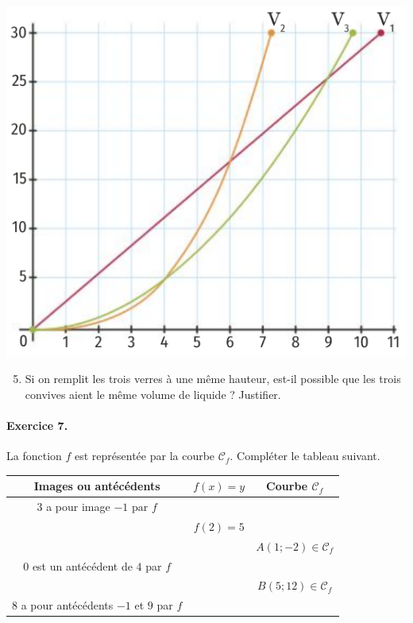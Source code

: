 \documentclass[11pt]{article}
\begin{document}
\begin{minipage}{.35\textwidth}
\includegraphics[scale=.3]{graph-verres.png}
\end{minipage}
\begin{enumerate}
    \setcounter{enumi}{4}
  \item Si on remplit les trois verres à une même hauteur, est-il possible que
    les trois convives aient le même volume de liquide ? Justifier.
\end{enumerate}

\paragraph{Exercice 7.} La fonction $f$ est représentée par la courbe
$\mathscr{C}_f$. Compléter le tableau suivant.
\begin{center}
  \def\arraystretch{2}
  \begin{tabular}{|c|c|c|}
    \hline
    \textbf{Images ou antécédents} & $f(x)=y$ & \textbf{Courbe} $\mathscr C_f$\\
    \hline
    $3$ a pour image $-1$ par $f$ & & \\
    \hline
    & $f(2)=5$ & \\
    \hline
    & & $A(1;-2)\in\mathscr C_f$ \\
    \hline
    $0$ est un antécédent de $4$ par $f$ & & \\
    \hline
    & & $B(5;12)\in\mathscr C_f$ \\
    \hline
    $8$ a pour antécédents $-1$ et $9$ par $f$ & & \\
    \hline
  \end{tabular}
\end{center}
\end{document}
